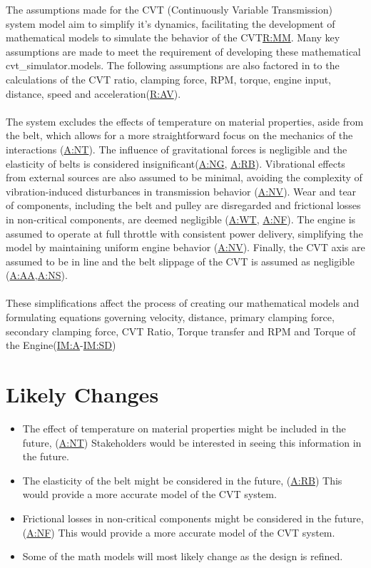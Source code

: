 \documentclass[12pt]{article}
\newcommand{\hpref}[1]{\hyperref[#1]{#1}}
\begin{document}
The assumptions made for the CVT (Continuously Variable Transmission) system model aim to simplify it's dynamics, facilitating the development of mathematical models to simulate the behavior of the CVT{\hpref{R:MM}}. 
Many key assumptions are made to meet the requirement of developing these mathematical cvt_simulator.models. The following assumptions are also factored in to the calculations of the CVT ratio, clamping force, RPM, torque, engine input, distance, speed and acceleration(\hpref{R:AV}). 
\\\\
\noindent The system excludes the effects of temperature on material properties, aside from the belt, which allows for a more straightforward focus on the mechanics of the interactions (\hpref{A:NT}).
The influence of gravitational forces is negligible and the elasticity of belts is considered insignificant(\hpref{A:NG}, \hpref{A:RB}). 
Vibrational effects from external sources are also assumed to be minimal, avoiding the complexity of vibration-induced disturbances in transmission behavior (\hpref{A:NV}).
Wear and tear of components, including the belt and pulley are disregarded and frictional losses in non-critical components, are deemed negligible (\hpref{A:WT}, \hpref{A:NF}). 
The engine is assumed to operate at full throttle with consistent power delivery, simplifying the model by maintaining uniform engine behavior (\hpref{A:NV}).
Finally, the CVT axis are assumed to be in line and the belt slippage of the CVT is assumed as negligible (\hpref{A:AA},\hpref{A:NS}). 
\\\\
\noindent These simplifications affect the process of creating our mathematical models and formulating equations governing velocity, distance, primary clamping force, secondary clamping force, CVT Ratio, Torque transfer and RPM and Torque of the Engine(\hpref{IM:A}-\hpref{IM:SD})

\section{Likely Changes}    

\noindent \begin{itemize}

\item[LC:TMP \label{LC:TMP}:] The effect of temperature on material properties might be included in the future, (\hpref{A:NT}) Stakeholders would be interested in seeing this information in the future.
\item[LC:EB \label{LC:EB}:] The elasticity of the belt might be considered in the future, (\hpref{A:RB}) This would provide a more accurate model of the CVT system.
\item[LC:FL \label{LC:FL}:] Frictional losses in non-critical components might be considered in the future, (\hpref{A:NF}) This would provide a more accurate model of the CVT system.
\item[LC:MM \label{LC:MM}:] Some of the math models will most likely change as the design is refined.

\end{itemize}
\end{document}
